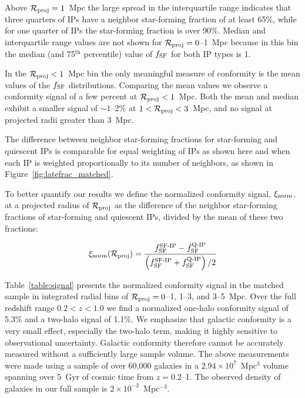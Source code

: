 Above $\mathcal{R}_{\text{proj}}=1$~Mpc the large spread in the interquartile range indicates that three quarters of IPs have a neighbor star-forming fraction of at least 65\%, while for one quarter of IPs the star-forming fraction is over 90\%.
Median and interquartile range values are not shown for $\mathcal{R}_{\text{proj}}=0$--1~Mpc because in this bin the median (and 75$^{\textrm{th}}$ percentile) value of $\flate$ for both IP types is 1.

In the $\mathcal{R}_{\text{proj}}<1$~Mpc bin the only meaningful measure of conformity is the mean values of the $\flate$ distributions.
Comparing the mean values we observe a conformity signal of a few percent at $\mathcal{R}_{\text{proj}}<1$~Mpc.
Both the mean and median exhibit a smaller signal of $\sim1$--2\% at $1<\mathcal{R}_{\text{proj}}<3$~Mpc, and no signal at projected radii greater than 3~Mpc.

The difference between neighbor star-forming fractions for star-forming and quiescent IPs is comparable for equal weighting of IPs as shown here and when each IP is weighted proportionally to its number of neighbors, as shown in Figure~\ref{fig:latefrac_matched}.





To better quantify our results we define the normalized conformity signal, 
$\signorm$, at a projected radius of $\mathcal{R}_{\text{proj}}$ as the difference of the neighbor star-forming fractions of star-forming and quiescent IPs, 
divided by the mean of these two fractions:

\begin{equation}
	\signorm(\Rproj) = \frac
	{ f^{\textrm{SF-IP}}_{\textrm{SF}}-f^{\textrm{Q-IP}}_{\textrm{SF}} }
	{ \left( f^{\textrm{SF-IP}}_{\textrm{SF}}+f^{\textrm{Q-IP}}_{\textrm{SF}} \right) /2}
\label{eq:signorm}
\end{equation}

Table~\ref{table:signal} presents the 
normalized conformity signal in the matched sample in integrated radial bins of 
{${\mathcal{R}_{\text{proj}}=0}$--1}, {1--3}, and {3--5~Mpc}.
Over the full redshift range ${0.2<z<1.0}$ we find a normalized one-halo conformity 
signal of 5.3\% and a two-halo signal of 1.1\%.
We emphasize that galactic conformity is a very small effect, especially the two-halo term, making it highly sensitive to observational uncertainty.
Galactic conformity therefore cannot be accurately measured without a sufficiently large sample volume.
The above measurements were made using a sample of over 60,000 galaxies in a ${2.94\times10^7}$~Mpc$^3$ volume spanning over 5~Gyr of cosmic time from $z=0.2$--1.
The observed density of galaxies in our full sample is ${2\times10^{-3}}$~Mpc$^{-3}$.

